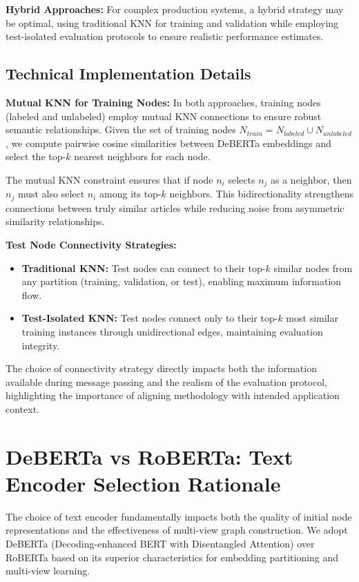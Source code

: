 \textbf{Hybrid Approaches:} For complex production systems, a hybrid strategy may be optimal, using traditional KNN for training and validation while employing test-isolated evaluation protocols to ensure realistic performance estimates.

\subsection{Technical Implementation Details}

\textbf{Mutual KNN for Training Nodes:} In both approaches, training nodes (labeled and unlabeled) employ mutual KNN connections to ensure robust semantic relationships. Given the set of training nodes $N_{train} = N_{labeled} \cup N_{unlabeled}$, we compute pairwise cosine similarities between DeBERTa embeddings and select the top-$k$ nearest neighbors for each node.

The mutual KNN constraint ensures that if node $n_i$ selects $n_j$ as a neighbor, then $n_j$ must also select $n_i$ among its top-$k$ neighbors. This bidirectionality strengthens connections between truly similar articles while reducing noise from asymmetric similarity relationships.

\textbf{Test Node Connectivity Strategies:}
\begin{itemize}
    \item \textbf{Traditional KNN:} Test nodes can connect to their top-$k$ similar nodes from any partition (training, validation, or test), enabling maximum information flow.
    \item \textbf{Test-Isolated KNN:} Test nodes connect only to their top-$k$ most similar training instances through unidirectional edges, maintaining evaluation integrity.
\end{itemize}

The choice of connectivity strategy directly impacts both the information available during message passing and the realism of the evaluation protocol, highlighting the importance of aligning methodology with intended application context.

\section{DeBERTa vs RoBERTa: Text Encoder Selection Rationale}

The choice of text encoder fundamentally impacts both the quality of initial node representations and the effectiveness of multi-view graph construction. We adopt DeBERTa (Decoding-enhanced BERT with Disentangled Attention) over RoBERTa based on its superior characteristics for embedding partitioning and multi-view learning.


